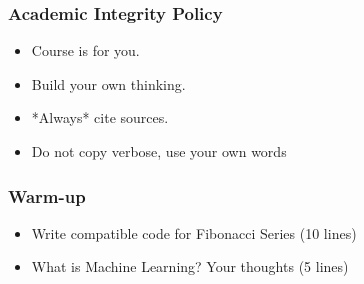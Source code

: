 \begin{frame}[fragile]\frametitle{Academic Integrity Policy}
\begin{itemize}
\item Course is for you.
\item Build your own thinking.
\item *Always* cite sources.
\item Do not copy verbose, use your own words
\end{itemize}
\end{frame}


\begin{frame}[fragile]\frametitle{Warm-up}
\begin{itemize}
\item Write compatible code for Fibonacci Series (10 lines)
\item What is Machine Learning? Your thoughts (5 lines)
\end{itemize}
\end{frame}
